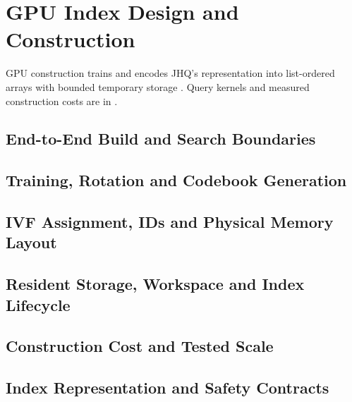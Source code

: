 \chapter{GPU Index Design and Construction}
\label{ch:architecture}
GPU construction trains and encodes JHQ's representation into list-ordered
arrays with bounded temporary storage \cite{jhq}. Query kernels and measured
construction costs are in .

\section{End-to-End Build and Search Boundaries}
\label{sec:4-1}


\section{Training, Rotation and Codebook Generation}
\label{sec:4-2}


\section{IVF Assignment, IDs and Physical Memory Layout}
\label{sec:4-3}


\section{Resident Storage, Workspace and Index Lifecycle}
\label{sec:4-4}


\section{Construction Cost and Tested Scale}
\label{sec:4-5}


\section{Index Representation and Safety Contracts}
\label{sec:4-6}

